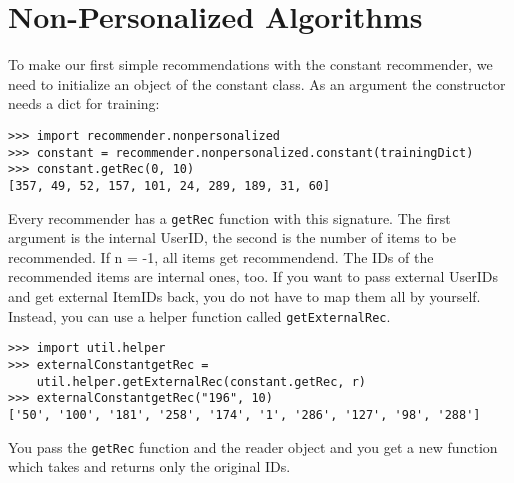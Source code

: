 \section{Non-Personalized Algorithms}
To make our first simple recommendations with the constant recommender,
we need to initialize an object of the constant class.
As an argument the constructor needs a dict for training:
\begin{lstlisting}[style=python]
>>> import recommender.nonpersonalized
>>> constant = recommender.nonpersonalized.constant(trainingDict)
>>> constant.getRec(0, 10)
[357, 49, 52, 157, 101, 24, 289, 189, 31, 60]
\end{lstlisting}
Every recommender has a \lstinline!getRec! function with this signature. The first argument is the internal
UserID, the second is the number of items to be recommended. If n = -1, all items get recommendend.
The IDs of the recommended items are internal ones, too.
If you want to pass external UserIDs and get external ItemIDs back, you do not have
to map them all by yourself. Instead, you can use a helper function called
\lstinline!getExternalRec!.
\begin{lstlisting}[style=python]
>>> import util.helper
>>> externalConstantgetRec = 
    util.helper.getExternalRec(constant.getRec, r)
>>> externalConstantgetRec("196", 10)
['50', '100', '181', '258', '174', '1', '286', '127', '98', '288']
\end{lstlisting}
You pass the \lstinline!getRec! function and the reader object and you get a new function
which takes and returns only the original IDs.

